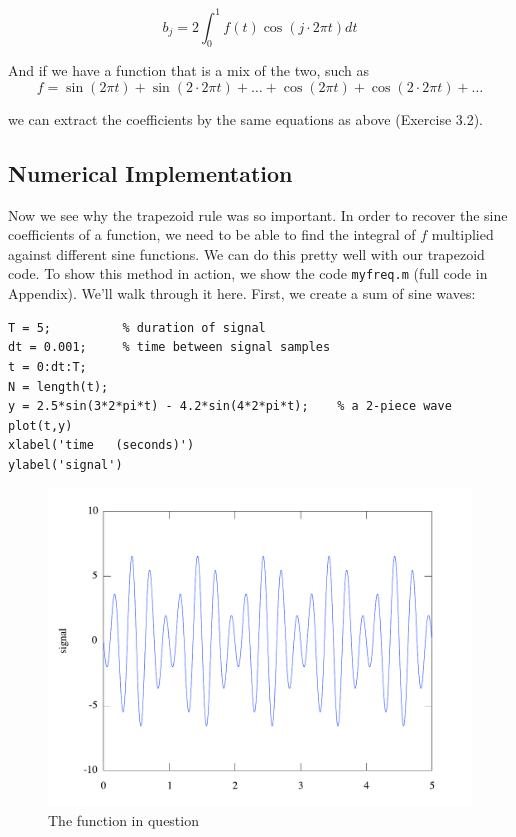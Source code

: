 \documentclass{article}
\begin{document}
\begin{equation}
\label{eq:coscf}
b_j = 2 \int_{0}^1f(t)\cos(j \cdot 2\pi t)dt
\end{equation}

And if we have a function that is a mix of the two, such as
\[f = \sin(2\pi t)+ \sin(2\cdot2\pi t) +\dots + \cos(2\pi t)+ \cos(2\cdot2\pi t) +\dots\]

we can extract the coefficients by the same equations as above (Exercise 3.2).


\subsection{Numerical Implementation}
Now we see why the trapezoid rule was so important.  In order to recover the sine coefficients of a function, we need to be able to find the integral of $f$ multiplied against different sine functions.  We can do this pretty well with our trapezoid code.  To show this method in action, we show the code {\tt myfreq.m} (full code in Appendix).  We'll walk through it here.  First, we create a sum of sine waves:

\begin{verbatim}
T = 5;			% duration of signal
dt = 0.001;     % time between signal samples
t = 0:dt:T;
N = length(t);
y = 2.5*sin(3*2*pi*t) - 4.2*sin(4*2*pi*t);    % a 2-piece wave
plot(t,y)
xlabel('time   (seconds)')
ylabel('signal')
\end{verbatim}

\begin{figure}[htbp]
\begin{center}
\includegraphics[scale=0.5]{mf_sine.pdf}
\caption{The function in question}
\label{default}
\end{center}
\end{figure}
\end{document}
